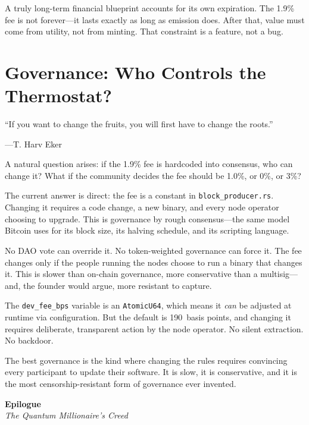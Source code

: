 \documentclass[11pt,a4paper]{article}
\begin{document}
\begin{principle}[title={\textbf{The Principle}}]
A truly long-term financial blueprint accounts for its own expiration.
The 1.9\% fee is not forever---it lasts exactly as long as emission
does. After that, value must come from utility, not from minting.
That constraint is a feature, not a bug.
\end{principle}


\section{Governance: Who Controls the Thermostat?}

\epigraph{``If you want to change the fruits, you will first have to
change the roots.''}%
{---T. Harv Eker}

A natural question arises: if the 1.9\% fee is hardcoded into consensus,
who can change it? What if the community decides the fee should be
1.0\%, or 0\%, or 3\%?

The current answer is direct: the fee is a constant in
\texttt{block\_producer.rs}. Changing it requires a code change, a new
binary, and every node operator choosing to upgrade. This is
governance by rough consensus---the same model Bitcoin uses for its
block size, its halving schedule, and its scripting language.

No DAO vote can override it. No token-weighted governance can force it.
The fee changes only if the people running the nodes choose to run a
binary that changes it. This is slower than on-chain governance, more
conservative than a multisig---and, the founder would argue, more
resistant to capture.

The \texttt{dev\_fee\_bps} variable is an \texttt{AtomicU64}, which means
it \emph{can} be adjusted at runtime via configuration. But the default
is 190~basis points, and changing it requires deliberate, transparent
action by the node operator. No silent extraction. No backdoor.

\begin{principle}[title={\textbf{The Principle}}]
The best governance is the kind where changing the rules requires
convincing every participant to update their software. It is slow,
it is conservative, and it is the most censorship-resistant form of
governance ever invented.
\end{principle}


\newpage
\begin{center}
{\LARGE\bfseries\color{wealthgold!80!black} Epilogue}\\[0.2cm]
{\Large\color{qnkblue}\itshape The Quantum Millionaire's Creed}\\[0.3cm]
\end{center}
\vspace{0.5cm}
\end{document}

